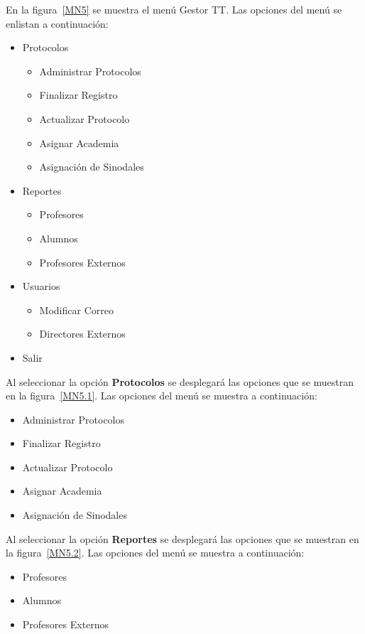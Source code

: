	En la figura~\ref{MN5} se muestra el menú Gestor TT. Las opciones del menú se enlistan a continuación:
	\begin{itemize}
		\item Protocolos
		\begin{itemize}
			\item Administrar Protocolos
			\item Finalizar Registro
			\item Actualizar Protocolo
			\item Asignar Academia
			\item Asignación de Sinodales
		\end{itemize}
		\item Reportes
		\begin{itemize}
			\item Profesores
			\item Alumnos
			\item Profesores Externos
		\end{itemize}
		\item Usuarios
		\begin{itemize}
			\item Modificar Correo
			\item Directores Externos
		\end{itemize}
		\item Salir
	\end{itemize}

	
	
	Al seleccionar la opción \textbf{Protocolos} se desplegará las opciones que se muestran en la figura~\ref{MN5.1}. Las opciones del menú se muestra a continuación:
	\begin{itemize}
		\item Administrar Protocolos
		\item Finalizar Registro
		\item Actualizar Protocolo
		\item Asignar Academia
		\item Asignación de Sinodales
	\end{itemize}

	
	
	Al seleccionar la opción \textbf{Reportes} se desplegará las opciones que se muestran en la figura~\ref{MN5.2}. Las opciones del menú se muestra a continuación:
	\begin{itemize}
		\item Profesores
		\item Alumnos
		\item Profesores Externos
	\end{itemize}

